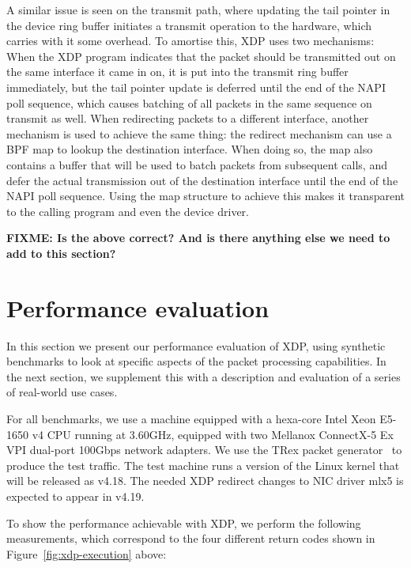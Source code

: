 \documentclass[10pt,sigconf]{acmart}
\begin{document}
A similar issue is seen on the transmit path, where updating the tail pointer in
the device ring buffer initiates a transmit operation to the hardware, which
carries with it some overhead. To amortise this, XDP uses two mechanisms: When
the XDP program indicates that the packet should be transmitted out on the same
interface it came in on, it is put into the transmit ring buffer immediately,
but the tail pointer update is deferred until the end of the NAPI poll sequence,
which causes batching of all packets in the same sequence on transmit as well.
When redirecting packets to a different interface, another mechanism is used to
achieve the same thing: the redirect mechanism can use a BPF map to lookup the
destination interface. When doing so, the map also contains a buffer that will
be used to batch packets from subsequent calls, and defer the actual
transmission out of the destination interface until the end of the NAPI poll
sequence. Using the map structure to achieve this makes it transparent to the
calling program and even the device driver.

\textbf{FIXME: Is the above correct? And is there anything else we need to add
  to this section?}

\section{Performance evaluation}
\label{sec:perf-eval}
In this section we present our performance evaluation of XDP, using synthetic
benchmarks to look at specific aspects of the packet processing capabilities. In
the next section, we supplement this with a description and evaluation of a
series of real-world use cases.

For all benchmarks, we use a machine equipped with a hexa-core Intel Xeon
E5-1650 v4 CPU running at 3.60GHz, equipped with two Mellanox ConnectX-5 Ex VPI
dual-port 100Gbps network adapters. We use the TRex packet
generator~\cite{cisco18:_trex_traff_gener} to produce the test traffic. The test
machine runs a version of the Linux kernel that will be released as v4.18. The
needed XDP redirect changes to NIC driver mlx5 is expected to appear in v4.19.


To show the performance achievable with XDP, we perform the following
measurements, which correspond to the four different return codes shown in
Figure~\ref{fig:xdp-execution} above:
\end{document}
